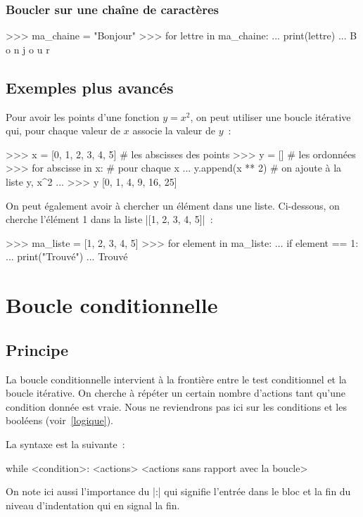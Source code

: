 		\subsubsection{Boucler sur une chaîne de caractères}
		\begin{pythoncode}
			>>> ma_chaine = "Bonjour"
			>>> for lettre in ma_chaine:
			... 	print(lettre)
			...
			B
			o
			n
			j
			o
			u
			r
		\end{pythoncode}
	
	\subsection{Exemples plus avancés}
		
		Pour avoir les points d'une fonction $y = x^2$, on peut utiliser une boucle itérative qui, pour chaque valeur de $x$ associe la valeur de $y$~:
		\begin{pythoncode}
			>>> x = [0, 1, 2, 3, 4, 5] # les abscisses des points
			>>> y = [] # les ordonnées
			>>> for abscisse in x: # pour chaque x
			... 	y.append(x ** 2) # on ajoute à la liste y, x^2
			...
			>>> y
			[0, 1, 4, 9, 16, 25]
		\end{pythoncode}
		
		On peut également avoir à chercher un élément dans une liste. Ci-dessous, on cherche l'élément 1 dans la liste \python|[1, 2, 3, 4, 5]|~:
		\begin{pythoncode}
			>>> ma_liste = [1, 2, 3, 4, 5]
			>>> for element in ma_liste:
			... 	if element == 1:
			... 		print("Trouvé")
			...
			Trouvé
		\end{pythoncode}

\section{Boucle conditionnelle}
	
	\subsection{Principe}
	
		La boucle conditionnelle intervient à la frontière entre le test conditionnel et la boucle itérative.
		On cherche à répéter un certain nombre d'actions tant qu'une condition donnée est vraie. Nous ne reviendrons pas ici sur les conditions et les booléens (voir~\ref{logique}).
		
		La syntaxe est la suivante~:
		\begin{pythoncode}
			while <condition>:
				<actions>
			<actions sans rapport avec la boucle>
		\end{pythoncode}
		On note ici aussi l'importance du \python|:| qui signifie l'entrée dans le bloc et la fin du niveau d'indentation qui en signal la fin.
	
